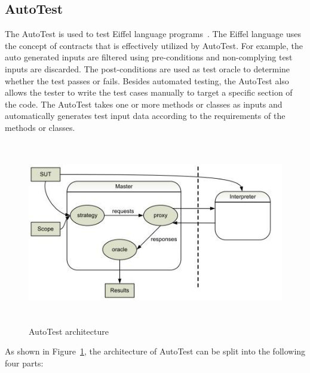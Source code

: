 \subsection{AutoTest} \label{autotest_2}
The AutoTest is used to test Eiffel language programs~\cite{ciupa2007automatic}. The Eiffel language uses the concept of contracts that is effectively utilized by AutoTest. For example, the auto generated inputs are filtered using pre-conditions and non-complying test inputs are discarded. The post-conditions are used as test oracle to determine whether the test passes or fails. Besides automated testing, the AutoTest also allows the tester to write the test cases manually to target a specific section of the code. The AutoTest takes one or more methods or classes as inputs and automatically generates test input data according to the requirements of the methods or classes.
\bigskip
\bigskip
\begin{figure}[h]
	\centering
	\includegraphics[width=14cm, height=8cm]{chapter2/autotest.png}
	\bigskip
	\caption{AutoTest architecture~\cite{leitner2007reconciling}}
	\label{fig:autotest}
\end{figure}
\bigskip
\noindent As shown in Figure~\ref{fig:autotest}, the architecture of AutoTest can be split into the following four parts:
